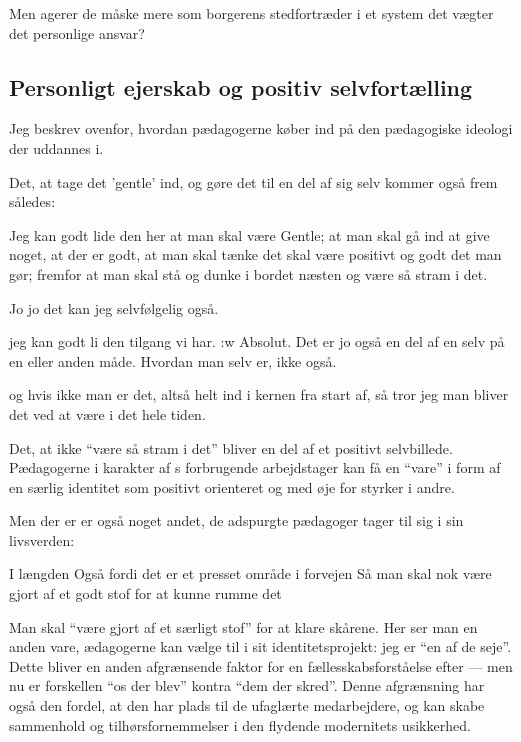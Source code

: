 Men agerer de måske mere som borgerens stedfortræder i et system det vægter det personlige ansvar?

\subsection{Personligt ejerskab og positiv selvfortælling}

Jeg beskrev ovenfor, hvordan pædagogerne køber ind på den pædagogiske ideologi der uddannes i.

Det, at tage det 'gentle' ind, og gøre det til en del af sig selv kommer også frem således:

\begin{description}

\AMB
Jeg kan godt lide den her at man skal være Gentle; at man skal gå ind at give noget, at der er godt, at man skal tænke det skal være positivt og godt det man gør; fremfor at man skal stå og dunke i bordet næsten og være så stram i det.

\DMC
Jo jo det kan jeg selvfølgelig også.

\AMB
jeg kan godt li den tilgang vi har.
:w
\DMC
Absolut. Det er jo også en del af en selv på en eller anden måde.
Hvordan man selv er, ikke også.

\AMB
og hvis ikke man er det, altså helt ind i kernen fra start af, så tror jeg man bliver det ved at være i det hele tiden.
\end{description}

Det, at ikke “være så stram i det” bliver en del af et positivt selvbillede.
Pædagogerne i karakter af \citeauthor{baumanLiquidModernity2000}s forbrugende arbejdstager kan få en “vare” i form af en særlig identitet som positivt orienteret og med øje for styrker i andre.

Men der er er også noget andet, de adspurgte pædagoger tager til sig i sin livsverden:

\begin{description}

\AMB
I længden
Også fordi det er et presset område i forvejen
Så man skal nok være gjort af et godt stof for at kunne rumme det
\end{description}

Man skal “være gjort af et særligt stof” for at klare skårene.
Her ser man en anden vare, ædagogerne kan vælge til i sit identitetsprojekt: jeg er “en af de seje”.
Dette bliver en anden afgrænsende faktor for en fællesskabsforståelse efter \citeauthor{baumanLiquidModernity2000} — men nu er forskellen “os der blev” kontra “dem der skred”.
Denne afgrænsning har også den fordel, at den har plads til de ufaglærte medarbejdere, og kan skabe sammenhold og tilhørsfornemmelser i den flydende modernitets usikkerhed.

